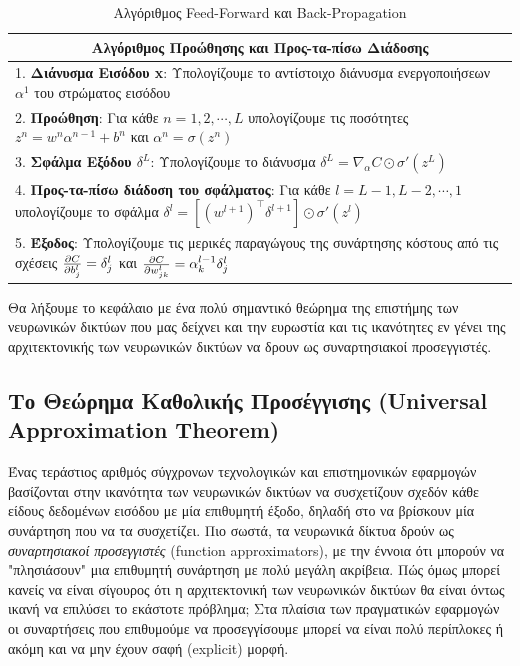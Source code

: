 \documentclass[11pt]{article} %
\numberwithin{equation}{subsection}
\begin{document}
\begin{table}[H]
\begin{tabular}{ |p{13cm}}
 \hline
 \multicolumn{1}{|c|}{\textbf{Αλγόριθμος Προώθησης και Προς-τα-πίσω Διάδοσης}} \\
 \hline
1. \textbf{Διάνυσμα Εισόδου x}: Υπολογίζουμε το αντίστοιχο διάνυσμα ενεργοποιήσεων $\alpha^{1}$ του στρώματος εισόδου  \\

2. \textbf{Προώθηση}: Για κάθε $n = 1,2,\cdots, L$ υπολογίζουμε τις ποσότητες $z^{n} = w^{n} \alpha^{n-1} + b^{n}$ και $\alpha^{n} = \sigma (z^{n})$\\

3. \textbf{Σφάλμα Εξόδου $\delta^{L}$}: Υπολογίζουμε το διάνυσμα $\delta^{L} = \nabla_{\alpha}C \odot \sigma'(z^{L})$ \\

4. \textbf{Προς-τα-πίσω διάδοση του σφάλματος}: Για κάθε $l = L-1, L-2, \cdots, 1$ υπολογίζουμε το σφάλμα $\delta^{l} = \left[(w^{l+1})^\intercal \delta^{l+1}\right] \odot \sigma'(z^{l})$  \\

5. \textbf{Έξοδος}: Υπολογίζουμε τις μερικές παραγώγους της συνάρτησης κόστους από τις σχέσεις $\pdv{C}{b_{j}^{l}} = \delta_{j}^{l}$ και $\pdv{C}{w_{jk}^{l}} = \alpha_{k}^{l-1} \delta_{j}^{l}$ \\

\hline
\end{tabular}
\caption{Αλγόριθμος Feed-Forward και Back-Propagation}
\end{table}

Θα λήξουμε το κεφάλαιο με ένα πολύ σημαντικό θεώρημα της επιστήμης των νευρωνικών δικτύων που μας δείχνει και την ευρωστία και τις ικανότητες εν γένει της αρχιτεκτονικής των νευρωνικών δικτύων να δρουν ως συναρτησιακοί προσεγγιστές.\\

\subsection{Το Θεώρημα Καθολικής Προσέγγισης (Universal Approximation Theorem)}

Ένας τεράστιος αριθμός σύγχρονων τεχνολογικών και επιστημονικών εφαρμογών βασίζονται στην ικανότητα των νευρωνικών δικτύων να συσχετίζουν σχεδόν κάθε είδους δεδομένων εισόδου με μία επιθυμητή έξοδο, δηλαδή στο να βρίσκουν μία συνάρτηση που να τα συσχετίζει. Πιο σωστά, τα νευρωνικά δίκτυα δρούν ως \textit{συναρτησιακοί προσεγγιστές} (function approximators), με την έννοια ότι μπορούν να "πλησιάσουν" μια επιθυμητή συνάρτηση με πολύ μεγάλη ακρίβεια. Πώς όμως μπορεί κανείς να είναι σίγουρος ότι η αρχιτεκτονική των νευρωνικών δικτύων θα είναι όντως ικανή να επιλύσει το εκάστοτε πρόβλημα; Στα πλαίσια των πραγματικών εφαρμογών οι συναρτήσεις που επιθυμούμε να προσεγγίσουμε μπορεί να είναι πολύ περίπλοκες ή ακόμη και να μην έχουν σαφή (explicit) μορφή. \\
\end{document}
